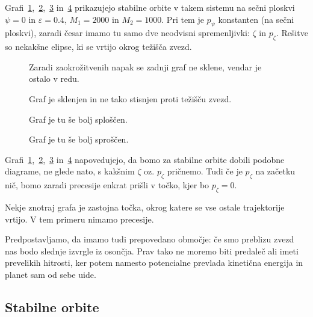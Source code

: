 \documentclass[12pt, a4paper]{article}
\begin{document}
Grafi~\ref{fig:L160},~\ref{fig:L180},~\ref{fig:L200} in~\ref{fig:L220} prikazujejo stabilne orbite v takem sistemu
na se\v cni ploskvi $\psi = 0$ in $\varepsilon = 0.4$, $M_1 = 2000$ in $M_2 = 1000$. Pri tem je $p_\psi$ konstanten
(na se\v cni ploskvi), zaradi \v cesar imamo tu samo dve neodvisni spremenljivki: $\zeta$ in $p_\zeta$. Re\v sitve
so nekak\v sne elipse, ki se vrtijo okrog te\v zi\v s\v ca zvezd. 

\begin{figure}[H]\centering
	
	\caption{Zaradi zaokro\v zitvenih napak se zadnji graf ne sklene, vendar je ostalo v redu.}
	\label{fig:L160}
\end{figure}

\begin{figure}[H]\centering
	
	\caption{Graf je sklenjen in ne tako stisnjen proti te\v zi\v s\v cu zvezd.}
	\label{fig:L180}
\end{figure}

\begin{figure}[H]\centering
	
	\caption{Graf je tu \v se bolj splo\v s\v cen.}
	\label{fig:L200}
\end{figure}

\begin{figure}[H]\centering
	
	\caption{Graf je tu \v se bolj spro\v s\v cen.}
	\label{fig:L220}
\end{figure}

Grafi~\ref{fig:L160},~\ref{fig:L180},~\ref{fig:L200} in~\ref{fig:L220} napovedujejo, da bomo za stabilne orbite
dobili podobne diagrame, ne glede nato, s kak\v snim $\zeta$ oz. $p_\zeta$ pri\v cnemo. Tudi \v ce je $p_\zeta$
na za\v cetku ni\v c, bomo zaradi precesije enkrat pri\v sli v to\v cko, kjer bo $p_\zeta = 0$.

Nekje znotraj grafa je zastojna to\v cka, okrog katere se vse ostale trajektorije vrtijo. V tem primeru nimamo
precesije.

Predpostavljamo, da imamo tudi prepovedano obmo\v cje: \v ce smo preblizu zvezd nas bodo slednje izvrgle iz
oson\v cja. Prav tako ne moremo biti predale\v c ali imeti prevelikih hitrosti, ker potem namesto potencialne
prevlada kineti\v cna energija in planet sam od sebe uide.

\subsection{Stabilne orbite}
\end{document}
